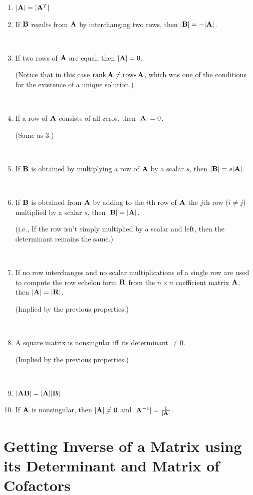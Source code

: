 \documentclass[]{book}
\theoremstyle{definition}
\theoremstyle{definition}
\theoremstyle{definition}
\theoremstyle{remark}
\begin{document}
\begin{enumerate}
        \item $|{\bf A}|=|{\bf A}^T|$\\
        \item \parbox[t]{2.7in}{If ${\bf B}$ results from ${\bf A}$ by interchanging two rows, then $|{\bf B}|=-|{\bf A}|$.}\
        \item \parbox[t]{2.7in}{If two rows of ${\bf A}$ are equal, then $|{\bf A}|=0$.}\qquad \parbox[t]{2.7in}{(Notice that in this case $\mbox{rank\,}{\bf A} \ne \mbox{rows\,}{\bf A}$, which was one of the conditions for the existence of a unique solution.)} \\
        \item \parbox[t]{2.7in}{If a row of ${\bf A}$ consists of all zeros, then $|{\bf A}|=0$.}\qquad \parbox[t]{2.7in}{(Same as 3.)}\\
        \item \parbox[t]{2.7in}{If ${\bf B}$ is obtained by multiplying a row of ${\bf A}$ by a scalar $s$, then $|{\bf B}|=s|{\bf A}|$.}\\
        \item \parbox[t]{2.7in}{If ${\bf B}$ is obtained from ${\bf A}$ by adding to the $i$th row of ${\bf A}$ the $j$th row ($i\ne j$) multiplied by a scalar $s$, then $|{\bf B}|=|{\bf A}|$.}\qquad \parbox[t]{2.7in}{(i.e., If the row isn't simply multiplied by a scalar and left,
then the determinant remains the same.)}\\
        \item \parbox[t]{2.7in}{If no row interchanges and no scalar multiplications of a single row are used to compute the row echelon form $\bf R$ from the $n\times n$ coefficient matrix ${\bf A}$, then $\bf |A|=|R|$.}\qquad \parbox[t]{2.7in}{(Implied by the previous properties.)}\\
        \item \parbox[t]{2.7in}{{A square matrix is nonsingular iff its determinant $\ne 0$.}} \qquad \parbox[t]{2.7in}{(Implied by the previous properties.)}\\
        \item $|{\bf A} {\bf B}|=|{\bf A}| |{\bf B}|$\\
        \item \parbox[t]{2.7in}{If ${\bf A}$ is nonsingular, then $|{\bf A}|\ne 0$ and $|{\bf A}^{-1}|=\frac{1}{|{\bf A}|}$.}
\end{enumerate}

\section{Getting Inverse of a Matrix using its Determinant and Matrix of
Cofactors}\label{getting-inverse-of-a-matrix-using-its-determinant-and-matrix-of-cofactors}
\end{document}
